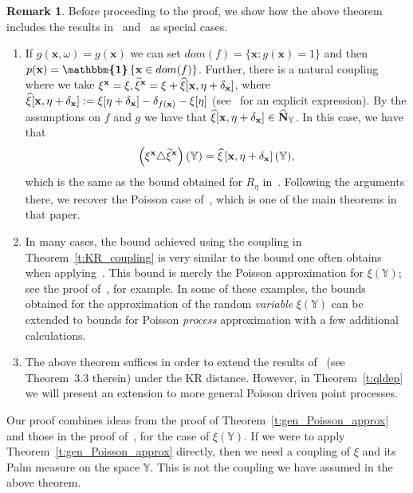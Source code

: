 \documentclass[10pt]{amsart}
\theoremstyle{definition}\newtheorem{defi}[theo]{Definition}\newtheorem{rema}[theo]{Remark}\newtheorem{exam}[theo]{Example}\newtheorem{exem}[theo]{Example}\newtheorem{nota}[theo]{Notation}
\newcommand*\bN{\mathbf{N}}
\newcommand{\bx}{\mathbf{x}}
\newcommand*\Y{\mathbb{Y}}
\newcommand*\txi{\tilde{\xi}}
\newcommand{\ind}{\boldsymbol{\mathbbm{1}}}
\newcommand{\set}[1]{\left\{#1\right\}}
\let\oldtilde\tilde
\renewcommand*{\tilde}[1]{\mathchoice{\widetilde{#1}}{\widetilde{#1}}{\oldtilde{#1}}{\oldtilde{#1}}}
\let\oldhat\hat
\renewcommand*{\hat}[1]{\mathchoice{\widehat{#1}}{\widehat{#1}}{\oldhat{#1}}{\oldhat{#1}}}
\begin{document}
\begin{rema}\label{rem:KRcoupling}
Before proceeding to the proof, we show how the above theorem includes the results in~\cite[Theorem~3.1]{penrose_inhomogeneous_2018} and~\cite[Theorem~3.1]{decreusefond_functional_2016} as special cases.
\begin{enumerate}
\item If $g(\bx,\omega) = g(\bx)$ we can set $dom(f) = \{ \bx : g(\bx) = 1\}$ and then $p(\bx) = \ind\set{\bx \in dom(f)}$. Further, there is a natural coupling where we take $\xi^{\bx} = \xi, \txi^{\bx} = \xi + \hat{\xi}[\bx,\eta + \delta_{\bx}]$, where $\hat{\xi}[\bx,\eta+ \delta_{\bx}]:= \xi[\eta + \delta_{\bx}] -\delta_{f(\bx)} - \xi[\eta]$ (see~\cite[(6.2)]{decreusefond_functional_2016} for an explicit expression). By the assumptions on $f$ and $g$ we have that $\hat{\xi}[\bx,\eta+ \delta_{\bx}] \in \widehat{\bN}_{\Y}$. In this case, we have that
\[
\left(\xi^{\bx} \triangle \txi^{\bx}\right)(\Y) = \hat{\xi}\left[\bx,\eta+ \delta_{\bx}\right](\Y),
\]
which is the same as the bound obtained for $R_{\eta}$ in~\cite[page~2172]{decreusefond_functional_2016}. Following the arguments there, we recover the Poisson case of~\cite[Theorem~3.1]{decreusefond_functional_2016}, which is one of the main theorems in that paper.

\item In many cases, the bound achieved using the coupling in Theorem~\ref{t:KR_coupling} is very similar to the bound one often obtains when applying~\cite[Theorem~3.1] {penrose_inhomogeneous_2018}. This bound is merely the Poisson approximation for $\xi(\Y)$; see the proof of~\cite[Theorem~2.8]{Iyer2020}, for example. In some of these examples, the bounds obtained for the approximation of the random \emph{variable} $\xi(\Y)$ can be extended to bounds for Poisson \emph{process} approximation with a few additional calculations.

\item The above theorem suffices in order to extend the results of~\cite{Otto2020} (see Theorem~3.3 therein) under the KR distance. However, in Theorem~\ref{t:qldep} we will present an extension to more general Poisson driven point processes.
\end{enumerate}
\end{rema}

Our proof combines ideas from the proof of Theorem~\ref{t:gen_Poisson_approx} and those in the proof of~\cite[Theorem~3.1]{penrose_inhomogeneous_2018}, for the case of $\xi(\Y)$. If we were to apply Theorem~\ref{t:gen_Poisson_approx} directly, then we need a coupling of $\xi$ and its Palm measure on the space $\Y$. This is not the coupling we have assumed in the above theorem.
\end{document}
